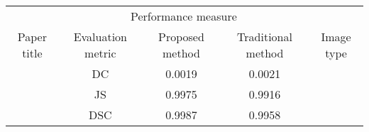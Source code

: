 \documentclass{article}
\begin{document}
\begin{tabular}{*{5}{c}}
	\toprule
	            & \multicolumn{3}{c}{Performance measure}                  &            \\ \cmidrule(lr){2-4}
	Paper title & Evaluation metric & Proposed method & Traditional method & Image type \\ \midrule
	            & DC                & 0.0019          & 0.0021                          \\
	            & JS                & 0.9975          & 0.9916                          \\
	            & DSC               & 0.9987          & 0.9958                          \\
	\bottomrule
\end{tabular}
\end{document}
